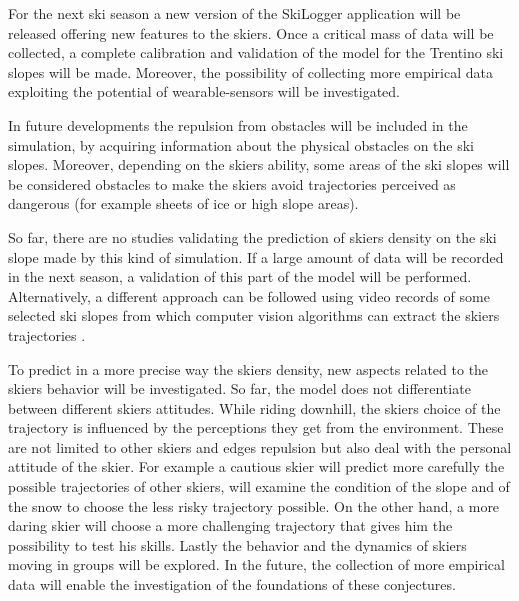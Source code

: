 \documentclass[12pt,a4paper,twoside]{book}
\begin{document}
For the next ski season a new version of the SkiLogger application will be released offering new features to the skiers. Once a critical mass of data will be collected, a complete calibration and validation of the model for the Trentino ski slopes will be made. Moreover, the possibility of collecting more empirical data exploiting the potential of wearable-sensors will be investigated.

In future developments the repulsion from obstacles will be included in the simulation, by acquiring information about the physical obstacles on the ski slopes. Moreover, depending on the skiers ability, some areas of the ski slopes will be considered obstacles to make the skiers avoid trajectories perceived as dangerous (for example sheets of ice or high slope areas).

So far, there are no studies validating the prediction of skiers density on the ski slope made by this kind of simulation. If a large amount of data will be recorded in the next season, a validation of this part of the model will be performed. Alternatively, a different approach can be followed using video records of some selected ski slopes from which computer vision algorithms can extract the skiers trajectories \cite{sc2010}.

To predict in a more precise way the skiers density, new aspects related to the skiers behavior will be investigated. So far, the model does not differentiate between different skiers attitudes. While riding downhill, the skiers choice of the trajectory is influenced by the perceptions they get from the environment. These are not limited to other skiers and edges repulsion but also deal with the personal attitude of the skier. For example a cautious skier will predict more carefully the possible trajectories of other skiers, will examine the condition of the slope and of the snow to choose the less risky trajectory possible. On the other hand, a more daring skier will choose a more challenging trajectory that gives him the possibility to test his skills. Lastly the behavior and the dynamics of skiers moving in groups will be explored. In the future, the collection of more empirical data will enable the investigation of the foundations of these conjectures.



\appendix
\end{document}

